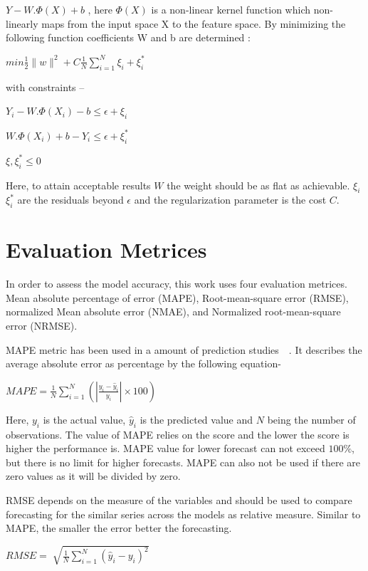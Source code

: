 $Y - W.\Phi (X)+b$ , here $\Phi (X)$ is a non-linear kernel function which non-linearly maps from the input space X to the feature space. By minimizing the following function coefficients W and b are determined :


$min  {\frac{1}{2}}\parallel w\parallel ^{2} + C\frac{1}{N}\sum_{i=1}^{N}\xi _i+\xi _i^*$

with constraints –


$Y_i - W.\Phi (X_{i})-b\leq \epsilon +\xi _{i}$

$W.\Phi (X_{i})+b-Y_{i}\leq \epsilon +\xi _{i}^*$

$\xi ,\xi _{i}^*\leq0$

Here, to attain acceptable results $W$ the weight should be as flat as achievable. $\xi _{i}$ $ \xi _{i}^*$ are the residuals beyond $\epsilon $ and the regularization parameter is the cost $C$. 




\section{Evaluation Metrices}
\label{Evaluation}

In order to assess the model accuracy, this work uses four evaluation metrices. Mean absolute percentage of error (MAPE), Root-mean-square error (RMSE), normalized Mean absolute error (NMAE), and Normalized root-mean-square error (NRMSE). 

MAPE metric has been used in a amount of prediction studies~\cite{ hu2015mid}~\cite{edwards2012predicting}. It describes the average absolute error as percentage by the following equation-

$MAPE = \frac{1}{N}\sum^{N}_{i=1}(\left | \frac{y_i - \hat y_i}{y_i} \right |\times 100)$

Here, $y_i$ is the actual value,  $ \hat y_i $ is the predicted value and $N$ being the number of observations. The value of MAPE relies on the score and the lower the score is higher the performance is. MAPE value for lower forecast can not exceed $100 \%$, but there is no limit for higher forecasts.  MAPE can also not be used if there are zero values as it will be divided by zero. 

RMSE depends on the measure of the variables and should be used to compare forecasting for the similar series across the models as relative measure. Similar to MAPE, the smaller the error better the forecasting. 

$RMSE = \sqrt[]{\frac{1}{N}\sum_{i=1}^{N}(\hat y_i - y_i)^2}$

